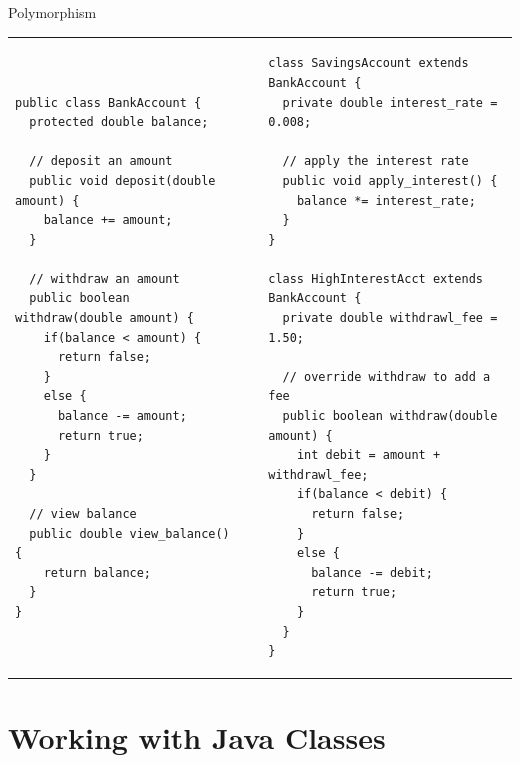 \documentclass{beamer}
\makeatletter
\newenvironment{splitslide}
{
\centering
\begin{tabular}{@{}p{0.50\textwidth} | p{0.025\textwidth}@{} p{0.4\textwidth}@{}}
}
{
\end{tabular}
}
\makeatother
\begin{document}
\begin{frame}[fragile]{Polymorphism}
\begin{splitslide}

\begin{Verbatim}[fontsize=\tiny]
public class BankAccount {
  protected double balance;
  
  // deposit an amount
  public void deposit(double amount) {
    balance += amount;
  }
  
  // withdraw an amount
  public boolean withdraw(double amount) {
    if(balance < amount) {
      return false;
    }
    else {
      balance -= amount;
      return true;
    }
  }
  
  // view balance
  public double view_balance() {
    return balance;  
  }
}
\end{Verbatim}

&&

\begin{Verbatim}[fontsize=\tiny]
class SavingsAccount extends BankAccount {
  private double interest_rate = 0.008;
  
  // apply the interest rate
  public void apply_interest() {
    balance *= interest_rate;
  }
}

class HighInterestAcct extends BankAccount {
  private double withdrawl_fee = 1.50;
  
  // override withdraw to add a fee
  public boolean withdraw(double amount) {
    int debit = amount + withdrawl_fee;    
    if(balance < debit) {
      return false;
    }
    else {
      balance -= debit;
      return true;
    }
  }
}
\end{Verbatim}

\end{splitslide}
\end{frame}


\section{Working with Java Classes}
\end{document}
